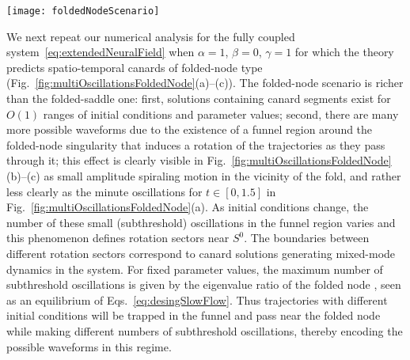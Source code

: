 \documentclass[aps,prl,reprint,superscriptaddress]{revtex4-1}
\newcommand{\epsi}{\varepsilon}
\newcommand{\edits}[1]{#1}
\begin{document}
\begin{figure*}
  \texttt{[image: foldedNodeScenario]}
  \caption{Examples of solutions containing spatio-temporal canards of
  folded-node type. Parameters are as in Fig.~\ref{fig:foldedSingCanards}, except
  $\alpha=\gamma=1$, $\beta=0$, for which the theory predicts folded-node canards. In
  (a)--(c) we plot the full spatio-temporal solution (a), its projection on the
  $(h,q,\xi)$ space (b) and on the \edits{$(q,\xi)$} plane (c); the latter show oscillations
  typical of folded-node canards, and therefore correspond to spatio-temporal
  folded-node canards in the neural field model. In (d)--(i) we set $\epsi = 3.6
  \cdot 10^{-3}$, $\alpha = 1$, $\gamma=0.7$ and retain all other parameter values;
  when initial conditions are varied slightly, a variable number of small
  oscillations is found near the folded node, as expected from the ODE theory.
  We set $q(0) = -18.35$ (label 1 in (d), (e), (f), (i)) and $q(0) = -18.40$
  (label 2 in (f), (g), (h), (i)). (f): Projections on the \edits{$(q,\xi)$} plane, revealing an
  initial drift near the folded node, during which trajectory 1 (2) displays 3 (5)
  small-amplitude oscillations around the folded singularity (see inset (i)).}
  \label{fig:multiOscillationsFoldedNode}
\end{figure*}

We next repeat our numerical analysis for the fully coupled
system~\eqref{eq:extendedNeuralField} when $\alpha=1$, $\beta=0$, $\gamma=1$ for
which the theory predicts spatio-temporal canards of folded-node type
(Fig.~\ref{fig:multiOscillationsFoldedNode}(a)--(c)). The
folded-node scenario is richer than the folded-saddle one: first, solutions
containing canard segments exist for $O(1)$ ranges of initial conditions
and parameter values; second, there are many more possible waveforms due
to the existence of a funnel region around the folded-node singularity that
induces a rotation of the trajectories as they pass through it; this effect
is clearly visible in Fig.~\ref{fig:multiOscillationsFoldedNode}(b)--(c) as
small amplitude spiraling motion in the vicinity of the fold, and rather less
clearly as the minute oscillations for $t \in [0, 1.5]$ in
Fig.~\ref{fig:multiOscillationsFoldedNode}(a). As initial conditions change, the
number of these small (subthreshold) oscillations in the funnel region
varies and this phenomenon defines rotation sectors near $S^0$. The boundaries
between different rotation sectors correspond to canard solutions generating
mixed-mode dynamics in the system. For fixed parameter values, the maximum
number of subthreshold oscillations is given by the eigenvalue ratio of the
folded node \cite{Desroches2012}, seen as an equilibrium of
Eqs.~\eqref{eq:desingSlowFlow}. Thus trajectories with different initial
conditions will be trapped in the funnel and pass near the folded node while
making different numbers of subthreshold oscillations, thereby encoding the possible
waveforms in this regime.
\end{document}

